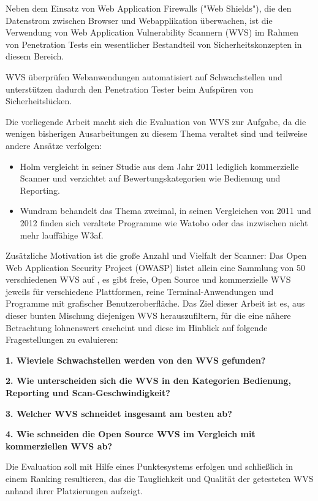 \documentclass[12pt,oneside,a4paper,parskip]{scrbook}
\begin{document}
Neben dem Einsatz von Web Application Firewalls ("Web Shields"), die den Datenstrom zwischen Browser und Webapplikation überwachen, ist die Verwendung von Web Application Vulnerability Scannern (WVS) im Rahmen von Penetration Tests ein wesentlicher Bestandteil von Sicherheitskonzepten in diesem Bereich.

WVS überprüfen Webanwendungen automatisiert auf Schwachstellen und unterstützen dadurch den Penetration Tester beim Aufspüren von Sicherheitslücken.

Die vorliegende Arbeit macht sich die Evaluation von WVS zur Aufgabe, da die wenigen bisherigen Ausarbeitungen zu diesem Thema veraltet sind und teilweise andere Ansätze verfolgen:

\begin{itemize}
  \item
  Holm \cite{Holm} vergleicht in seiner Studie aus dem Jahr 2011 lediglich kommerzielle Scanner und verzichtet auf Bewertungskategorien wie Bedienung und Reporting.
  \item
  Wundram \cite{Wundram}\cite{Wundram2} behandelt das Thema zweimal, in seinen Vergleichen von 2011 und 2012 finden sich veraltete Programme wie Watobo oder das inzwischen nicht mehr lauffähige W3af.
\end{itemize}

Zusätzliche Motivation ist die große Anzahl und Vielfalt der Scanner: Das Open Web Application Security Project (OWASP) listet allein eine Sammlung von 50 verschiedenen WVS auf \cite{OWASPtools}, es gibt freie, Open Source und kommerzielle WVS jeweils für verschiedene Plattformen, reine Terminal-Anwendungen und Programme mit grafischer Benutzeroberfläche.
Das Ziel dieser Arbeit ist es, aus dieser bunten Mischung diejenigen WVS herauszufiltern, für die eine nähere Betrachtung lohnenswert erscheint und diese im Hinblick auf folgende Fragestellungen zu evaluieren:

\textbf{1. Wieviele Schwachstellen werden von den WVS gefunden?}

\textbf{2. Wie unterscheiden sich die WVS in den Kategorien Bedienung, Reporting und Scan-Geschwindigkeit?}

\textbf{3. Welcher WVS schneidet insgesamt am besten ab?}
\newpage

\textbf{4. Wie schneiden die Open Source WVS im Vergleich mit kommerziellen WVS ab?}

Die Evaluation soll mit Hilfe eines Punktesystems erfolgen und schließlich in einem Ranking resultieren, das die Tauglichkeit und Qualität der getesteten WVS anhand ihrer Platzierungen aufzeigt.
\end{document}
